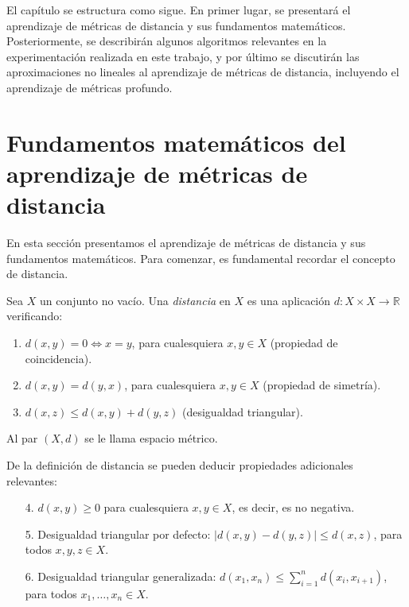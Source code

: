 El capítulo se estructura como sigue. En primer lugar, se presentará el aprendizaje de métricas de distancia y sus fundamentos matemáticos. Posteriormente, se describirán algunos algoritmos relevantes en la experimentación realizada en este trabajo, y por último se discutirán las aproximaciones no lineales al aprendizaje de métricas de distancia, incluyendo el aprendizaje de métricas profundo.

\section{Fundamentos matemáticos del aprendizaje de métricas de distancia} \label{sec:dist}

En esta sección presentamos el aprendizaje de métricas de distancia y sus fundamentos matemáticos. Para comenzar, es fundamental recordar el concepto de distancia.

\begin{definicion}
    Sea $X$ un conjunto no vacío. Una \emph{distancia} en $X$ es una aplicación $d\colon X\times X \to \mathbb{R}$ verificando:
    \begin{enumerate}
        \item $d(x,y) = 0 \iff x = y$, para cualesquiera $x, y \in X$ (propiedad de coincidencia).
        \item $d(x,y) = d(y,x)$, para cualesquiera $x,y \in X$ (propiedad de simetría).
        \item $d(x,z) \le d(x,y) + d(y,z)$ (desigualdad triangular).
    \end{enumerate}
    Al par $(X, d)$ se le llama espacio métrico.
\end{definicion}

De la definición de distancia se pueden deducir propiedades adicionales relevantes:

\begin{enumerate}
    \item[4.] $d(x, y) \ge 0$ para cualesquiera $x, y \in X$, es decir, es no negativa.
    \item[5.] Desigualdad triangular por defecto: $|d(x,y) - d(y,z)| \le d(x,z)$, para todos $x,y,z \in X$.
    \item[6.] Desigualdad triangular generalizada: $d(x_1, x_n) \le \sum_{i=1}^n d(x_i, x_{i+1})$, para todos $x_1, \dots, x_n \in X$.
\end{enumerate}


